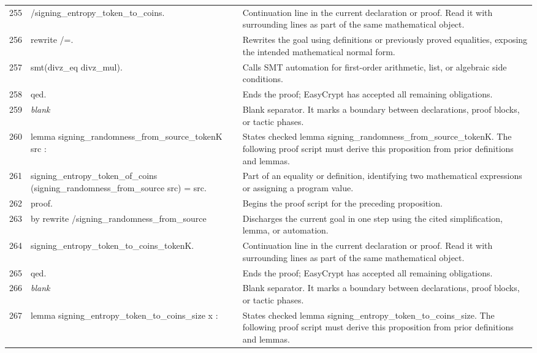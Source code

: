 \documentclass[10pt]{article}
\begin{document}
\begin{longtable}{r L{0.53\textwidth} L{0.37\textwidth}}
255 & {\ttfamily\scriptsize         /signing\_entropy\_token\_to\_coins.} & Continuation line in the current declaration or proof.  Read it with surrounding lines as part of the same mathematical object. \\
256 & {\ttfamily\scriptsize rewrite /=.} & Rewrites the goal using definitions or previously proved equalities, exposing the intended mathematical normal form. \\
257 & {\ttfamily\scriptsize smt(divz\_eq divz\_mul).} & Calls SMT automation for first-order arithmetic, list, or algebraic side conditions. \\
258 & {\ttfamily\scriptsize qed.} & Ends the proof; EasyCrypt has accepted all remaining obligations. \\
259 & {\ttfamily\scriptsize \emph{blank}} & Blank separator.  It marks a boundary between declarations, proof blocks, or tactic phases. \\
260 & {\ttfamily\scriptsize lemma signing\_randomness\_from\_source\_tokenK src :} & States checked lemma signing\_randomness\_from\_source\_tokenK.  The following proof script must derive this proposition from prior definitions and lemmas. \\
261 & {\ttfamily\scriptsize   signing\_entropy\_token\_of\_coins (signing\_randomness\_from\_source src) = src.} & Part of an equality or definition, identifying two mathematical expressions or assigning a program value. \\
262 & {\ttfamily\scriptsize proof.} & Begins the proof script for the preceding proposition. \\
263 & {\ttfamily\scriptsize by rewrite /signing\_randomness\_from\_source} & Discharges the current goal in one step using the cited simplification, lemma, or automation. \\
264 & {\ttfamily\scriptsize            signing\_entropy\_token\_to\_coins\_tokenK.} & Continuation line in the current declaration or proof.  Read it with surrounding lines as part of the same mathematical object. \\
265 & {\ttfamily\scriptsize qed.} & Ends the proof; EasyCrypt has accepted all remaining obligations. \\
266 & {\ttfamily\scriptsize \emph{blank}} & Blank separator.  It marks a boundary between declarations, proof blocks, or tactic phases. \\
267 & {\ttfamily\scriptsize lemma signing\_entropy\_token\_to\_coins\_size x :} & States checked lemma signing\_entropy\_token\_to\_coins\_size.  The following proof script must derive this proposition from prior definitions and lemmas. \\

\end{longtable}
\end{document}
